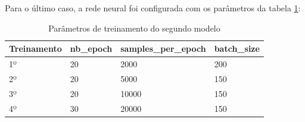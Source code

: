 	\begin{figure}[H]
		\centering
\end{figure}

Para o último caso, a rede neural foi configurada com os parâmetros da tabela \ref{tabela2}:

\begin{table}[H]
\centering
\caption{Parâmetros de treinamento do segundo modelo}
\label{tabela2}
\begin{tabular}{|l|l|l|l|}
\hline
\textbf{Treinamento} & \textbf{nb\_epoch} & \textbf{samples\_per\_epoch} & \textbf{batch\_size} \\ \hline
1º        & 20        & 2000                & 200         \\
2º        & 20        & 5000                & 150         \\
3º        & 20        & 10000               & 150         \\
4º        & 30        & 20000               & 150         \\ \hline
\end{tabular}
\end{table}

